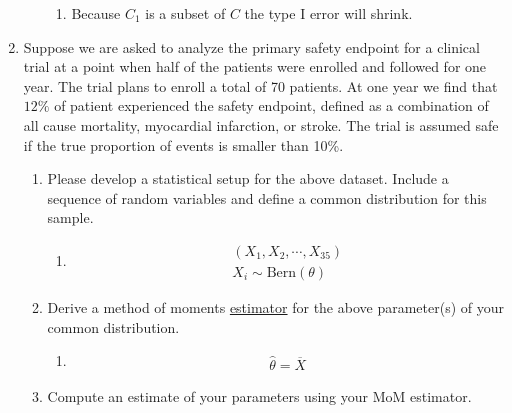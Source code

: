 \documentclass[krantz1,ChapterTOCs]{krantz}
\begin{document}
\begin{enumerate}
\begin{enumerate}
        \begin{enumerate}
            \item {\color{red} 
                Because $C_{1}$ is a subset of $C$ the type I error will shrink.
            }
        \end{enumerate}
    
    \end{enumerate}
    
    \item Suppose we are asked to analyze the primary safety endpoint for a clinical trial at a point when half of the patients were enrolled and followed for one year. The trial plans to enroll a total of 70 patients. At one year we find that $12\%$ of patient experienced the safety endpoint, defined as a combination of all cause mortality, myocardial infarction, or stroke. The trial is assumed safe if the true proportion of events is smaller than 10\%. 
    
    \begin{enumerate}
        \item Please develop a statistical setup for the above dataset. Include a  sequence of random variables and define a common distribution for this sample.
        
        \begin{enumerate}
            \item {\color{red} 
            
            \begin{align}
                (X_{1},X_{2},\cdots,X_{35}) \\
                X_{i} \sim \text{Bern}(\theta)
            \end{align}
            }
        \end{enumerate}
    
        
        \item Derive a method of moments \underline{estimator} for the above parameter(s) of your common distribution.
        
        \begin{enumerate}
            \item {\color{red}
                \begin{align}
                    \hat{\theta} = \overline{X}    
                \end{align}
            }
        \end{enumerate}
    
        
        \item Compute an estimate of your parameters using your MoM estimator.
        

\end{enumerate}
\end{enumerate}
\end{document}
